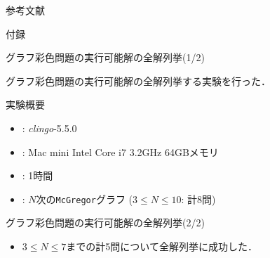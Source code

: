 \documentclass[dvipdfmx,11pt]{beamer}
\newcommand{\code}[1]{\lstinline[basicstyle=\ttfamily]{#1}}
\begin{document}
\begin{frame}[noframenumbering]{参考文献}
\end{frame}


\begin{frame}[noframenumbering]{}
 \thispagestyle{empty}
 \Huge 付録
\end{frame}

\begin{frame}[noframenumbering]{グラフ彩色問題の実行可能解の全解列挙(1/2)}
 \thispagestyle{empty}

 \begin{block}{}
  グラフ彩色問題の実行可能解の全解列挙する実験を行った．  
 \end{block}

 \begin{block}{実験概要}
  \begin{itemize}
   \item {}: \textit{clingo}-5.5.0
   \item {}: Mac mini Intel Core i7 3.2GHz 64GBメモリ
   \item {}: 1時間
   \item {}: $N$次の\code{McGregor}グラフ ($3 \leq N\leq 10$: 計8問)
  \end{itemize}
 \end{block}
\end{frame}

\begin{frame}[noframenumbering]{グラフ彩色問題の実行可能解の全解列挙(2/2)}
 \thispagestyle{empty}

 \begin{center}
 \end{center}

 \begin{itemize}
  \item $3 \leq N\leq 7$までの計5問について全解列挙に成功した．
 \end{itemize}
\end{frame}

\end{document}
